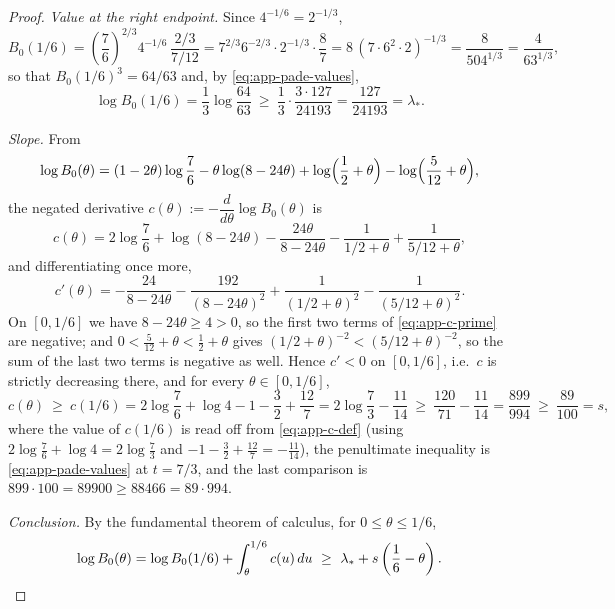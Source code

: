 \begin{proof}
\emph{Value at the right endpoint.}
Since $4^{-1/6}=2^{-1/3}$,
\[
        B_0(1/6)
        =\left(\frac76\right)^{2/3}4^{-1/6}\,\frac{2/3}{7/12}
        =7^{2/3}6^{-2/3}\cdot2^{-1/3}\cdot\frac{8}{7}
        =8\,(7\cdot6^2\cdot2)^{-1/3}
        =\frac{8}{504^{1/3}}
        =\frac{4}{63^{1/3}},
\]
so that $B_0(1/6)^3=64/63$ and, by \eqref{eq:app-pade-values},
\begin{equation}\label{eq:app-lam-star}
        \log B_0(1/6)=\frac13\log\frac{64}{63}
        \ \ge\ \frac13\cdot\frac{3\cdot127}{24193}
        =\frac{127}{24193}=\lambda_* .
\end{equation}

\emph{Slope.}  From
\[
        \log B_0(\theta)
        =(1-2\theta)\log\frac76-\theta\log(8-24\theta)
        +\log\Bigl(\frac12+\theta\Bigr)-\log\Bigl(\frac5{12}+\theta\Bigr),
\]
the negated derivative $c(\theta):=-\dfrac{d}{d\theta}\log B_0(\theta)$ is
\begin{equation}\label{eq:app-c-def}
        c(\theta)
        =2\log\frac76+\log(8-24\theta)-\frac{24\theta}{8-24\theta}
        -\frac{1}{1/2+\theta}+\frac{1}{5/12+\theta},
\end{equation}
and differentiating once more,
\begin{equation}\label{eq:app-c-prime}
        c'(\theta)
        =-\frac{24}{8-24\theta}-\frac{192}{(8-24\theta)^2}
        +\frac{1}{(1/2+\theta)^2}-\frac{1}{(5/12+\theta)^2}.
\end{equation}
On $[0,1/6]$ we have $8-24\theta\ge4>0$, so the first two terms of
\eqref{eq:app-c-prime} are negative; and $0<\frac5{12}+\theta<\frac12+\theta$
gives $(1/2+\theta)^{-2}<(5/12+\theta)^{-2}$, so the sum of the last two
terms is negative as well.  Hence $c'<0$ on $[0,1/6]$, i.e.\ $c$ is strictly
decreasing there, and for every $\theta\in[0,1/6]$,
\begin{equation}\label{eq:app-c-lb}
        c(\theta)\ \ge\ c(1/6)
        =2\log\frac76+\log4-1-\frac32+\frac{12}7
        =2\log\frac73-\frac{11}{14}
        \ \ge\ \frac{120}{71}-\frac{11}{14}
        =\frac{899}{994}
        \ \ge\ \frac{89}{100}=s,
\end{equation}
where the value of $c(1/6)$ is read off from \eqref{eq:app-c-def} (using
$2\log\frac76+\log4=2\log\frac73$ and $-1-\frac32+\frac{12}7=-\frac{11}{14}$),
the penultimate inequality is \eqref{eq:app-pade-values} at $t=7/3$, and the
last comparison is $899\cdot100=89900\ge88466=89\cdot994$.

\emph{Conclusion.}  By the fundamental theorem of calculus, for
$0\le\theta\le1/6$,
\[
        \log B_0(\theta)
        =\log B_0(1/6)+\int_\theta^{1/6}c(u)\,du
        \ \ge\ \lambda_*+s\left(\frac16-\theta\right). \qedhere
\]
\end{proof}

